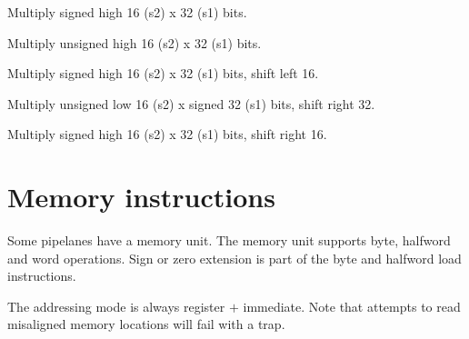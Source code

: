 Multiply signed high 16 (s2) x 32 (s1) bits.

Multiply unsigned high 16 (s2) x 32 (s1) bits.

Multiply signed high 16 (s2) x 32 (s1) bits, shift left 16.

Multiply unsigned low 16 (s2) x signed 32 (s1) bits, shift right 32.

Multiply signed high 16 (s2) x 32 (s1) bits, shift right 16.

\section{Memory instructions}


Some \rvex{} pipelanes have a memory unit. The memory unit supports byte,
halfword and word operations. Sign or zero extension is part of the byte and
halfword load instructions.

The addressing mode is always register $+$ immediate. Note that attempts to read
misaligned memory locations will fail with a  trap.

